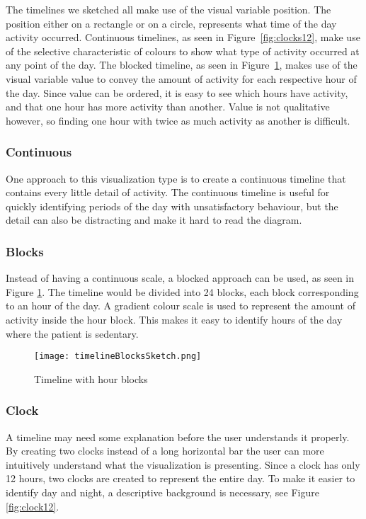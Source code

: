 The timelines we sketched all make use of the visual variable position. The position either on a rectangle or on a circle, represents what time of the day activity occurred. Continuous timelines, as seen in Figure~\ref{fig:clocks12}, make use of the selective characteristic of colours to show what type of activity occurred at any point of the day. The blocked timeline, as seen in Figure~\ref{fig:timelineBlocks}, makes use of the visual variable value to convey the amount of activity for each respective hour of the day. Since value can be ordered, it is easy to see which hours have activity, and that one hour has more activity than another. Value is not qualitative however, so finding one hour with twice as much activity as another is difficult.

\subsubsection{Continuous}
One approach to this visualization type is to create a continuous timeline that contains every little detail of activity. The continuous timeline is useful for quickly identifying periods of the day with unsatisfactory behaviour, but the detail can also be distracting and make it hard to read the diagram.

\subsubsection{Blocks}
Instead of having a continuous scale, a blocked approach can be used, as seen in Figure \ref{fig:timelineBlocks}. The timeline would be divided into 24 blocks, each block corresponding to an hour of the day. A gradient colour scale is used to represent the amount of activity inside the hour block. This makes it easy to identify hours of the day where the patient is sedentary. 

\begin{figure}[h!]
	\centering
		\texttt{[image: timelineBlocksSketch.png]}
		\caption[T2 sketch]{Timeline with hour blocks}
		\label{fig:timelineBlocks}
\end{figure}

\subsubsection{Clock}
A timeline may need some explanation before the user understands it properly. By creating two clocks instead of a long horizontal bar the user can more intuitively understand what the visualization is presenting. Since a clock has only 12 hours, two clocks are created to represent the entire day. To make it easier to identify day and night, a descriptive background is necessary, see Figure \ref{fig:clock12}.

